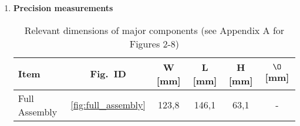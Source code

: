 \documentclass[10pt]{article}
\begin{document}
\begin{enumerate}[label=\Alph*.]
\begin{multicols}{2}
\begin{itemize}
			      \item 1 $\times$ $220 \Omega$ resistor
			      \item 1 $\times$ $1 k\Omega$ resistor
			      \item 2 $\times$ Twist Nut Caps
			      \item 2 $\times$ Spade Connectors
		      \end{itemize}
	      \end{multicols}
	\item \textbf{Precision measurements}
	      \begin{table}[H]
		      \centering
		      \caption{Relevant dimensions of major components (see Appendix A for Figures 2-8)}
		      \label{tab:dim_condensed}
		      \begin{tabular}{l c c c c c}
			      \toprule
			      Item                                               & Fig.\ ID                & W [mm] & L [mm] & H [mm] & $\O$ [mm] \\
			      \midrule
			      Full Assembly                                      & \ref{fig:full_assembly} & 123,8  & 146,1  & 63,1   & -         \\


\end{tabular}
\end{table}
\end{enumerate}
\end{document}
